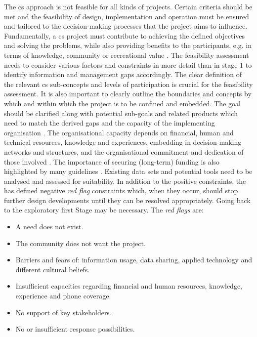 The \acrlong{cs} approach is not feasible for all kinds of projects. Certain criteria should be met and the feasibility of design, implementation and operation must be ensured and tailored to the decision-making processes that the project aims to influence. Fundamentally, a \acrshort{cs} project must contribute to achieving the defined objectives and solving the problems, while also providing benefits to the participants, e.g. in terms of knowledge, community or recreational value \autocite{escaeuropeancitizenscienceassociationTenPrinciplesCitizen2015,fraislCitizenScienceEnvironmental2022}. The feasibility assessment needs to consider various factors and constraints in more detail than in stage 1 to identify information and management gaps accordingly. The clear definition of the relevant \acrshort{cs} sub-concepts and levels of participation is crucial for the feasibility assessment. It is also important to clearly outline the boundaries and concepts by which and within which the project is to be confined and embedded. The goal should be clarified along with potential sub-goals and related products which need to match the derived gaps and the capacity of the implementing organisation \autocite{ifrcCommunityBasedSurveillanceGuiding2017,minkmanCitizenScienceWater2015}. The organisational capacity depends on financial, human and technical resources, knowledge and experiences, embedding in decision-making networks and structures, and the organisational commitment and dedication of those involved \autocite{fraislCitizenScienceEnvironmental2022,ifrcCommunityBasedSurveillanceGuiding2017}. The importance of securing (long-term) funding is also highlighted by many guidelines \autocite{cervoniImplementingIntegratedWater2008,minkmanCitizenScienceWater2015,sharpeCommunityBasedEcological2006, whitelawEstablishingCanadianCommunity2003}. Existing data sets and potential tools need to be analysed and assessed for suitability. In addition to the positive constraints, the \autocite{ ifrcCommunityBasedSurveillanceGuiding2017} has defined negative \textit{red flag} constraints which, when they occur, should stop further design developments until they can be resolved appropriately. Going back to the exploratory first Stage may be necessary. The \textit{red flags} are:

\begin{itemize}
    \item A need does not exist.
    \item The community does not want the project.
    \item Barriers and fears of: information usage, data sharing, applied technology and different cultural beliefs.
    \item Insufficient capacities regarding financial and human resources, knowledge, experience and phone coverage.
    \item No support of key stakeholders.
    \item No or insufficient response possibilities.
\end{itemize}

